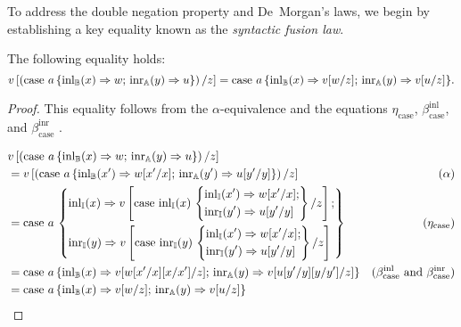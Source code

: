 To address the double negation property and De~Morgan's laws, we begin by establishing a key equality known as the \emph{syntactic fusion law}.

\begin{lemma} 
  The following equality holds:
  \begin{equation*}
   v \left[ \left(\text{case } a \,\{\mathrm{inl}_{\mathbb{B}}(x) \Rightarrow w ; \, \mathrm{inr}_{\mathbb{A}}(y) \Rightarrow u\}\right)  / z \right]  =  \text{case } a \,\{\mathrm{inl}_{\mathbb{B}}(x) \Rightarrow v[w/z] ; \, \mathrm{inr}_{\mathbb{A}}(y) \Rightarrow v[u/z]\}.
  \end{equation*}
\end{lemma}

  \begin{proof}
    
This equality follows from the $\alpha$-equivalence and the equations $\eta_{\text{case}}$, $\beta_{\text{case}}^{\text{inl}}$, and $\beta_{\text{case}}^{\text{inr}}$ . 

\begin{equation*}
\begin{split}
  & v \left[ \left(\text{case } a \,\{\mathrm{inl}_{\mathbb{B}}(x) \Rightarrow w ; \, \mathrm{inr}_{\mathbb{A}}(y) \Rightarrow u\}\right)  / z \right] & \\
  & =v  \left[ \left(\text{case } a \,\{\mathrm{inl}_{\mathbb{B}}(x') \Rightarrow w[x'/x] ; \, \mathrm{inr}_{\mathbb{A}}(y') \Rightarrow u[y'/y]\}\right)  / z \right] & (\alpha) \\
  & = \text{case } a\,
\left\{
    \begin{aligned} 
    &\mathrm{inl}_{\mathbb{I}}(x) \Rightarrow v \left[ \text{case } \mathrm{inl}_{\mathbb{I}}(x)\,
\left\{
    \begin{aligned} 
    &\mathrm{inl}_{\mathbb{I}}(x') \Rightarrow w[x'/x] ; \\
    &\mathrm{inr}_{\mathbb{I}}(y') \Rightarrow u[y'/y]  \\ 
  \end{aligned}  
  \right\} / z \right] ; \\
    &\mathrm{inr}_{\mathbb{I}}(y) \Rightarrow   v \left[ \text{case } \mathrm{inr}_{\mathbb{I}}(y)\,
\left\{
    \begin{aligned} 
    &\mathrm{inl}_{\mathbb{I}}(x') \Rightarrow w[x'/x] ; \\
    &\mathrm{inr}_{\mathbb{I}}(y') \Rightarrow u[y'/y]  \\ 
  \end{aligned}  
  \right\} / z \right] \\
  \end{aligned}  
  \right\} & (\eta_{\text{case}}) \\
   & = \text{case } a \,\{\mathrm{inl}_{\mathbb{B}}(x) \Rightarrow v[w[x'/x][x/x']/z] ; \, \mathrm{inr}_{\mathbb{A}}(y) \Rightarrow v[u[y'/y][y/y']/z]\}   & (\beta_{\text{case}}^{\text{inl}} \text{ and } \beta_{\text{case}}^{\text{inr}}  ) \\
   & =  \text{case } a \,\{\mathrm{inl}_{\mathbb{B}}(x) \Rightarrow v[w/z] ; \, \mathrm{inr}_{\mathbb{A}}(y) \Rightarrow v[u/z]\}   
\end{split}
\end{equation*}
  \end{proof}


